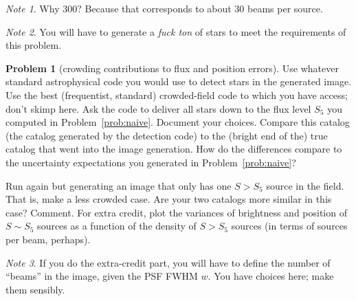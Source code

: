 \documentclass{article}
\theoremstyle{definition}
\newcommand{\problemname}{Problem}
\newtheorem{problem}{\problemname}
\newcommand{\probref}[1]{\problemname~\ref{#1}}
\theoremstyle{remark}
\newcommand{\notename}{Note}
\newtheorem{note}{\notename}[problem]
\begin{document}
\begin{note}
Why $300$? Because that corresponds to about 30 beams per source.
\end{note}

\begin{note}
You will have to generate a \emph{fuck ton} of stars to meet the requirements of this problem.
\end{note}

\begin{problem}[crowding contributions to flux and position errors]\label{prob:trad}
Use whatever standard astrophysical code you would use to detect stars in the generated image.
Use the best (frequentist, standard) crowded-field code to which you have access; don't skimp here.
Ask the code to deliver all stars down to the flux level $S_5$ you computed in \probref{prob:naive}.
Document your choices.
Compare this catalog (the catalog generated by the detection code) to the (bright end of the) true catalog that went into the image generation.
How do the differences compare to the uncertainty expectations you generated in \probref{prob:naive}?

Run again but generating an image that only has one $S>S_5$ source in the field.
That is, make a less crowded case.
Are your two catalogs more similar in this case?
Comment.
For extra credit, plot the variances of brightness and position of $S\sim S_5$ sources as a function of the density of $S>S_5$ sources (in terms of sources per beam, perhaps).
\end{problem}

\begin{note}
If you do the extra-credit part, you will have to define the number of ``beams'' in the image, given the PSF FWHM $w$.
You have choices here; make them sensibly.
\end{note}
\end{document}
